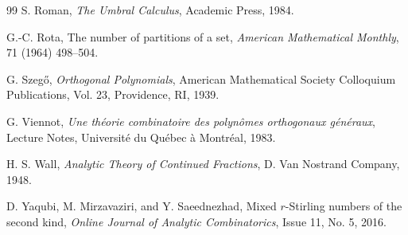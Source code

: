\documentclass[12pt]{amsart}
\theoremstyle{definition}
\begin{document}
\begin{thebibliography}{99}
S. Roman,
\textit{The Umbral Calculus},
Academic Press, 1984.

G.-C. Rota,
The number of partitions of a set,
\textit{American Mathematical Monthly}, 71 (1964) 498--504.

G. Szegő, 
\textit{Orthogonal Polynomials}, 
American Mathematical Society Colloquium Publications, Vol. 23, Providence, RI, 1939.

G. Viennot,
\textit{Une théorie combinatoire des polynômes orthogonaux généraux},
Lecture Notes, Université du Québec à Montréal, 1983.

H. S. Wall,
\textit{Analytic Theory of Continued Fractions},
D. Van Nostrand Company, 1948.

D. Yaqubi, M. Mirzavaziri, and Y. Saeednezhad, 
Mixed $r$-Stirling numbers of the second kind, 
\textit{Online Journal of Analytic Combinatorics}, Issue 11, No. 5, 2016.


\end{thebibliography}
\end{document}
